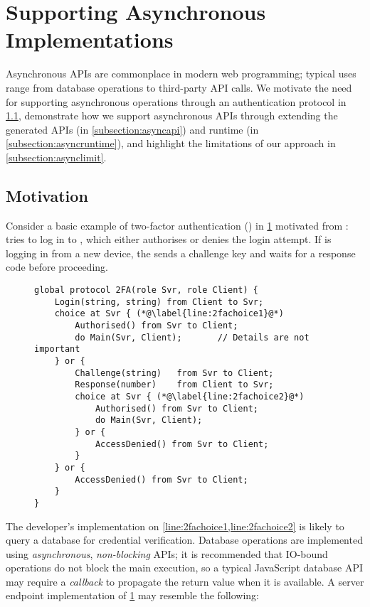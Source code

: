 \section{Supporting Asynchronous Implementations}
\label{section:async}

Asynchronous APIs are commonplace in modern web programming;
typical uses range from
database operations to third-party API calls.
We motivate the need for supporting asynchronous operations
through an authentication protocol in
\cref{subsection:asyncmotivation},
demonstrate how we support asynchronous APIs through extending
the generated APIs (in \cref{subsection:asyncapi}) 
and runtime (in \cref{subsection:asyncruntime}),
and highlight the limitations of our approach in
\cref{subsection:asynclimit}.

\subsection{Motivation}
\label{subsection:asyncmotivation}

Consider a basic example of two-factor authentication 
() in \cref{lst:2FA} motivated from \cite{Exceptional}:
 tries to log in to , which either
authorises or denies the login attempt. If  is logging 
in from a new device, the  sends a challenge key
and waits for a response code before proceeding.

\begin{figure}[!h]
\begin{lstlisting}[language=scribble]
global protocol 2FA(role Svr, role Client) {
	Login(string, string) from Client to Svr;
	choice at Svr { (*@\label{line:2fachoice1}@*)
		Authorised() from Svr to Client;
		do Main(Svr, Client);		// Details are not important
	} or {
		Challenge(string)	from Svr to Client;
		Response(number) 	from Client to Svr;
		choice at Svr { (*@\label{line:2fachoice2}@*)
			Authorised() from Svr to Client;
			do Main(Svr, Client);
		} or {
			AccessDenied() from Svr to Client;
		}
	} or {
		AccessDenied() from Svr to Client;	
	}
}
\end{lstlisting}
\label{lst:2FA}
\end{figure}

The developer's implementation on 
\cref{line:2fachoice1,line:2fachoice2} is likely to query
a database for credential verification.
Database operations are implemented using \textit{asynchronous},
\textit{non-blocking} APIs; it is
recommended that IO-bound operations do not block the main execution,
so a typical JavaScript database API may require a \textit{callback}
to propagate the return value when it is available.
A server endpoint implementation of \cref{lst:2FA}
may resemble the following:

